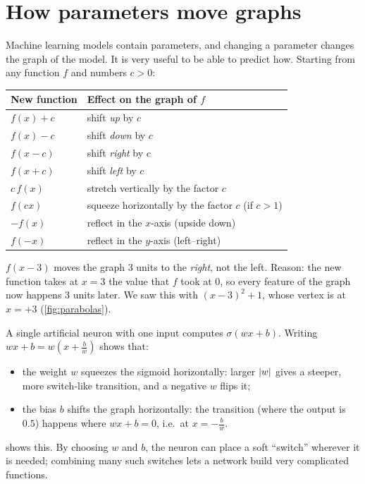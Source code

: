 \section{How parameters move graphs}\label{sec:transformations}

Machine learning models contain parameters, and changing a parameter changes
the graph of the model. It is very useful to be able to predict how. Starting
from any function $f$ and numbers $c > 0$:

\begin{center}
\renewcommand{\arraystretch}{1.25}
\begin{tabular}{@{}ll@{}}
\toprule
\textbf{New function} & \textbf{Effect on the graph of $f$}\\
\midrule
$f(x) + c$ & shift \emph{up} by $c$\\
$f(x) - c$ & shift \emph{down} by $c$\\
$f(x - c)$ & shift \emph{right} by $c$\\
$f(x + c)$ & shift \emph{left} by $c$\\
$c\,f(x)$ & stretch vertically by the factor $c$\\
$f(cx)$ & squeeze horizontally by the factor $c$ (if $c > 1$)\\
$-f(x)$ & reflect in the $x$-axis (upside down)\\
$f(-x)$ & reflect in the $y$-axis (left--right)\\
\bottomrule
\end{tabular}
\end{center}

\begin{pitfall}
$f(x - 3)$ moves the graph $3$ units to the \emph{right}, not the left. Reason:
the new function takes at $x = 3$ the value that $f$ took at $0$, so every
feature of the graph now happens $3$ units later. We saw this with
$(x - 3)^2 + 1$, whose vertex is at $x = +3$ (\cref{fig:parabolas}).
\end{pitfall}

\begin{mlnote}
A single artificial neuron with one input computes $\sigma(wx + b)$. Writing
$wx + b = w\left(x + \tfrac bw\right)$ shows that:
\begin{itemize}
  \item the weight $w$ squeezes the sigmoid horizontally: larger $\lvert w\rvert$ gives
    a steeper, more switch-like transition, and a negative $w$ flips it;
  \item the bias $b$ shifts the graph horizontally: the transition (where the
    output is $0.5$) happens where $wx + b = 0$, i.e.\ at $x = -\tfrac bw$.
\end{itemize}
 shows this. By choosing $w$ and $b$, the neuron can
place a soft ``switch'' wherever it is needed; combining many such switches
lets a network build very complicated functions.
\end{mlnote}

